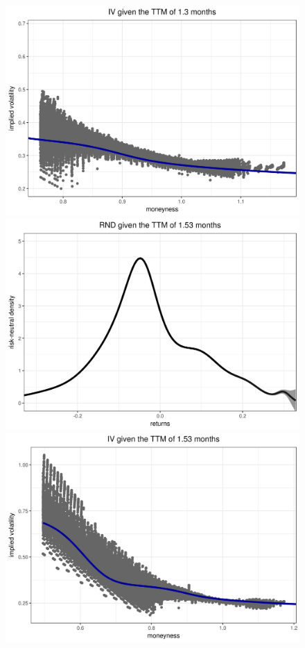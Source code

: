 \documentclass[a4paper,12pt]{article}
\theoremstyle{plain}
\theoremstyle{definition}
\begin{document}
\begin{figure}[H]
\begin{center}
 \endminipage
 \hspace{3mm}
 \includegraphics[width=\linewidth]{figures/hour_1th/GOOG_20150105_iv_smile_1th_hour_ttm_1_3.png}
 \endminipage\\
 \includegraphics[width=\linewidth]{figures/hour_1th/GOOG_20150105_rnd_ci_1th_hour_ttm_1_53.png}
 \endminipage
 \hspace{3mm}
 \includegraphics[width=\linewidth]{figures/hour_1th/GOOG_20150105_iv_smile_1th_hour_ttm_1_53.png}

\end{center}
\end{figure}
\end{document}
